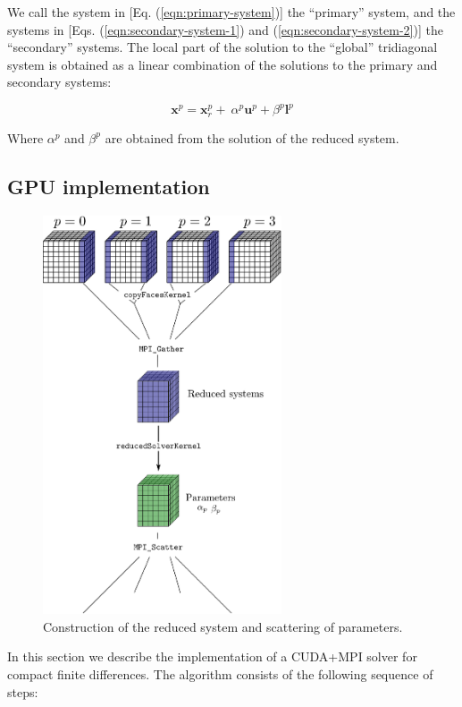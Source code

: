 \documentclass{elsarticle}
\begin{document}
We call the system in [Eq. (\ref{eqn:primary-system})]
the ``primary'' system, and the systems in
[Eqs.
(\ref{eqn:secondary-system-1}) and (\ref{eqn:secondary-system-2})]
the ``secondary'' systems.
The local part of the solution to the ``global'' tridiagonal system
is obtained as a linear combination of
the solutions to the primary and secondary systems:

\begin{equation}
    \boldsymbol{x}^p = \boldsymbol{x}_r^p + \
        \alpha^p \boldsymbol{u}^p + \beta^p \boldsymbol{l}^p
    \label{eqn:sum-of-systems}
\end{equation}

Where $\alpha^p$ and $\beta^p$ are obtained
from the solution of the reduced system.

\subsection{GPU implementation}

\begin{figure}[h!]
\begin{center}
\includegraphics[width=200pt]{img/constructing-reduced-system.eps}
\caption{Construction of the reduced system and scattering of parameters.}
\label{fig:reduced-system}
\end{center}
\end{figure}

In this section we describe the implementation of
a CUDA+MPI solver for compact finite differences.
The algorithm 
consists of the following sequence of steps:
\end{document}
